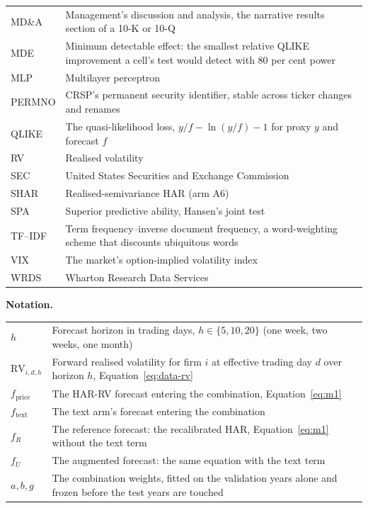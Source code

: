 {\begin{tabular}{@{}>{\raggedright\arraybackslash}p{}>{\raggedright\arraybackslash}p{}@{}}
MD\&A & Management's discussion and analysis, the narrative results section of a 10-K or 10-Q \\
MDE & Minimum detectable effect: the smallest relative QLIKE improvement a cell's test would detect with 80 per cent power \\
MLP & Multilayer perceptron \\
PERMNO & CRSP's permanent security identifier, stable across ticker changes and renames \\
QLIKE & The quasi-likelihood loss, $y/f - \ln(y/f) - 1$ for proxy $y$ and forecast $f$ \\
RV & Realised volatility \\
SEC & United States Securities and Exchange Commission \\
SHAR & Realised-semivariance HAR (arm A6) \\
SPA & Superior predictive ability, Hansen's joint test \\
TF--IDF & Term frequency--inverse document frequency, a word-weighting scheme that discounts ubiquitous words \\
VIX & The market's option-implied volatility index \\
WRDS & Wharton Research Data Services \\
\bottomrule
\end{tabular}\par
}

\vspace{3mm}
\noindent\textbf{Notation.}
\par\nobreak
\vspace{1mm}
{\small\singlespacing
\noindent\begin{tabular}{@{}>{\raggedright\arraybackslash}p{}>{\raggedright\arraybackslash}p{}@{}}
\toprule
$h$ & Forecast horizon in trading days, $h \in \{5, 10, 20\}$ (one week, two weeks, one month) \\
$\mathrm{RV}_{i,d,h}$ & Forward realised volatility for firm $i$ at effective trading day $d$ over horizon $h$, Equation~\eqref{eq:data-rv} \\
$f_{\text{price}}$ & The HAR-RV forecast entering the combination, Equation~\eqref{eq:m1} \\
$f_{\text{text}}$ & The text arm's forecast entering the combination \\
$f_R$ & The reference forecast: the recalibrated HAR, Equation~\eqref{eq:m1} without the text term \\
$f_U$ & The augmented forecast: the same equation with the text term \\
$a, b, g$ & The combination weights, fitted on the validation years alone and frozen before the test years are touched \\
\bottomrule
\end{tabular}\par
}

